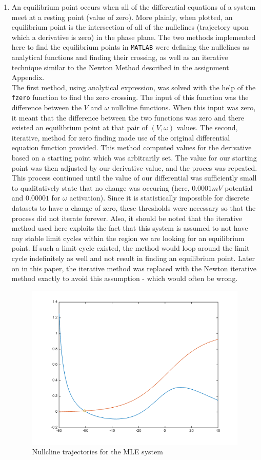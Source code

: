 \documentclass[10pt]{report}
\newcommand{\matlab}[1]{\texttt{#1}}
\begin{document}
\begin{enumerate}
\item An equilibrium point occurs when all of the differential equations of a system meet at a resting point (value of zero). More plainly, when plotted, an equilibrium point is the intersection of all of the nullclines (trajectory upon which a derivative is zero) in the phase plane. The two methods implemented here to find the equilibrium points in \matlab{MATLAB} were defining the nullclines as analytical functions and finding their crossing, as well as an iterative technique similar to the Newton Method described in the assignment Appendix. \\ The first method, using analytical expression, was solved with the help of the \matlab{fzero} function to find the zero crossing. The input of this function was the difference between the $V$ and $\omega$ nullcline functions. When this input was zero, it meant that the difference between the two functions was zero and there existed an equilibrium point at that pair of $(V, \omega)$ values. The second, iterative, method for zero finding made use of the original differential equation function provided. This method computed values for the derivative based on a starting point which was arbitrarily set. The value for our starting point was then adjusted by our derivative value, and the proces was repeated. This process continued until the value of our differential was sufficiently small to qualitatively state that no change was occuring (here, $0.0001 mV$ potential and $0.00001$ for $\omega$ activation). Since it is statistically impossible for discrete datasets to have a change of zero, these thresholds were necessary so that the process did not iterate forever. Also, it should be noted that the iterative method used here exploits the fact that this system is assumed to not have any stable limit cycles within the region we are looking for an equilibrium point. If such a limit cycle existed, the method would loop around the limit cycle indefinitely as well and not result in finding an equilibrium point. Later on in this paper, the iterative method was replaced with the Newton iterative method exactly to avoid this assumption - which would often be wrong. \begin{figure}[h!] \includegraphics[scale=0.66]{motnq2.png} \caption[h1]{Nullcline trajectories for the MLE system} \end{figure}

\end{enumerate}
\end{document}
